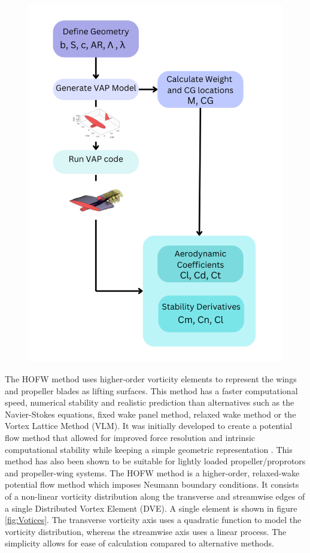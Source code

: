  \begin{figure}
 \includegraphics[]{04_Methodology/Figs/jasmine.png}
 \label{fig:flowchart}
 \end{figure}


The HOFW method uses higher-order vorticity elements to represent the wings and propeller blades as lifting surfaces. This method has a faster computational speed, numerical stability and realistic prediction than alternatives such as the Navier-Stokes equations, fixed wake panel method, relaxed wake method or the Vortex Lattice Method (VLM). It was initially developed to create a potential flow method that allowed for improved force resolution and intrinsic computational stability while keeping a simple geometric representation \cite{}. This method has also been shown to be suitable for lightly loaded propeller/proprotors and propeller-wing systems. The HOFW method is a higher-order, relaxed-wake potential flow method which imposes Neumann boundary conditions. It consists of a non-linear vorticity distribution along the transverse and streamwise edges of a single Distributed Vortex Element (DVE). A single element is shown in figure \ref{fig:Votices}. The transverse vorticity axis uses a quadratic function to model the vorticity distribution, whereas the streamwise axis uses a linear process. The simplicity allows for ease of calculation compared to alternative methods. 

